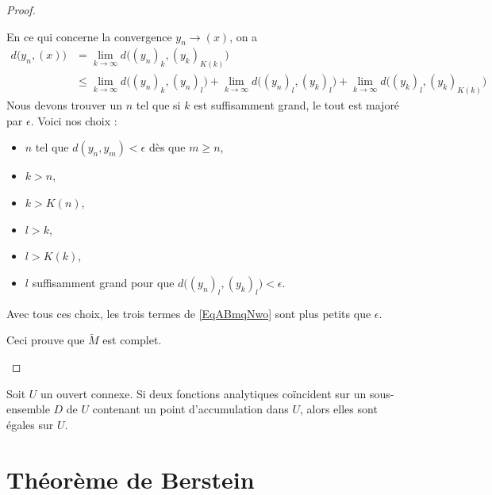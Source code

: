 \begin{proof}
\begin{subproof}
        En ce qui concerne la convergence \( y_n\to (x)\), on a 
        \begin{subequations}
            \begin{align}
                d\big( y_n,(x) \big)&=\lim_{k\to \infty} d\big( (y_n)_k,(y_k)_{K(k)} \big)\\
                &\leq \lim_{k\to \infty} d\big( (y_n)_k,(y_n)_l \big)+\lim_{k\to \infty} d\big( (y_n)_l,(y_k)_{l} \big)+\lim_{k\to \infty} d\big( (y_k)_l,(y_k)_{K(k)} \big)    \label{EqABmqNwo}
            \end{align}
        \end{subequations}
        Nous devons trouver un \( n\) tel que si \( k\) est suffisamment grand, le tout est majoré par \( \epsilon\). Voici nos choix :
        \begin{itemize}
            \item \( n\) tel que \( d(y_n,y_m)<\epsilon\) dès que \( m\geq n\),
            \item \( k>n\),
            \item \( k>K(n)\),
            \item \( l>k\),
            \item \( l>K(k)\),
            \item \( l\) suffisamment grand pour que \( d\big( (y_n)_l,(y_k)_l \big)<\epsilon\).
        \end{itemize}
        Avec tous ces choix, les trois termes de \eqref{EqABmqNwo} sont plus petits que \( \epsilon\).

        Ceci prouve que \( \tilde M\) est complet.
    \end{subproof}
\end{proof}

\begin{theorem}\label{ThoAVBCewB}
    Soit \( U\) un ouvert connexe. Si deux fonctions analytiques coïncident sur un sous-ensemble \( D\) de \( U\) contenant un point d'accumulation dans \( U\), alors elles sont égales sur \( U\).
\end{theorem}

\section{Théorème de Berstein}

